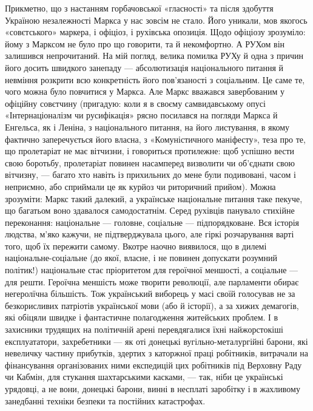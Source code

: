 Прикметно, що з настанням горбачовської «гласності» та після здобуття 
Україною незалежності Маркса у нас зовсім не стало. Його уникали, мов 
якогось «совєтського» маркера, і офіціоз, і рухівська опозиція. Щодо 
офіціозу зрозуміло: йому з Марксом не було про що говорити, та й 
некомфортно. А \mbox{РУХ}ом він залишився непрочитаний. На мій погляд, велика 
помилка \mbox{РУХ}у й одна з причин його досить швидкого занепаду — 
абсолютизація національного питання й невміння розкрити всю 
конкретність його пов'язаності з соціальним. Це саме те, чого можна 
було повчитися у Маркса. Але Маркс вважався завербованим у офіційну 
совєтчину (пригадую: коли я в своєму самвидавському опусі 
«Інтернаціоналізм чи русифікація» рясно посилався на погляди Маркса 
й Енгельса, як і Леніна, з національного питання, на його листування, в 
якому фактично заперечується його власна, з «Комуністичного 
маніфесту», теза про те, що пролетаріат не має вітчизни, і говориться 
протилежне: щоб успішно вести свою боротьбу, пролетаріат повинен 
насамперед визволити чи об'єднати свою вітчизну, — багато хто навіть 
із прихильних до мене були подивовані, часом і неприємно, або 
сприймали це як курйоз чи риторичний прийом). Можна зрозуміти: Маркс 
такий далекий, а українське національне питання таке пекуче, що 
багатьом воно здавалося самодостатнім. Серед рухівців панувало 
стихійне переконання: національне — головне, соціальне — 
підпорядковане. Вся історія людства, м'яко кажучи, не підтверджувала 
цього, але гіркі розчарування варті того, щоб їх пережити самому. 
Вкотре наочно виявилося, що в дилемі національне-соціальне (до якої, 
власне, і не повинен допускати розумний політик!) національне стає 
пріоритетом для героїчної меншості, а соціальне — для решти. Героїчна 
меншість може творити революції, але парламенти обирає негеролїчна 
більшість. Тож український виборець у масі своїй голосував не за 
безкорисливих патріотів української мови (або й історії), а за хижих 
демагогів, які обіцяли швидке і фантастичне полагодження житейських 
проблем. І в захисники трудящих на політичній арені перевдягалися 
їхні найжорстокіші експлуататори, захребетники — як оті донецькі 
вугільно-металургійні барони, які невеличку частину прибутків, 
здертих з каторжної праці робітників, витрачали на фінансування 
організованих ними експедицій цих робітників під Верховну Раду чи 
Кабмін, для стукання шахтарськими касками, — так, ніби це українські 
урядовці, а не вони, донецькі барони, винні в несплаті заробітку і в 
жахливому занедбанні техніки безпеки та постійних катастрофах. 


